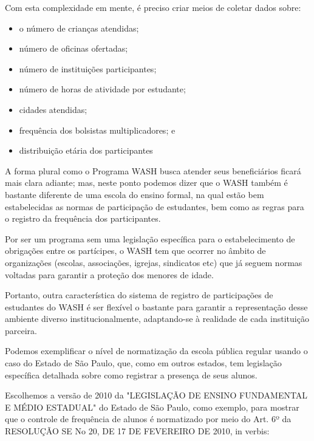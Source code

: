 Com esta complexidade em mente, é preciso criar meios de coletar dados sobre:


\begin{itemize}
\item o número de crianças atendidas;
\item número de oficinas ofertadas;
\item número de instituições participantes;
\item número de horas de atividade por estudante;
\item cidades atendidas;
\item frequência dos bolsistas multiplicadores; e
\item distribuição etária dos participantes
\end{itemize}



A forma plural como o Programa WASH busca atender seus beneficiários ficará mais clara adiante; mas, neste ponto podemos dizer que o WASH também é bastante diferente de uma escola do ensino formal, na qual estão bem estabelecidas as normas de participação de estudantes, bem como as regras para o registro da frequência dos participantes.

Por ser um programa sem uma legislação específica para o estabelecimento de obrigações entre os partícipes, o WASH tem que ocorrer no âmbito de organizações (escolas, associações, igrejas, sindicatos etc) que já seguem normas voltadas para garantir a proteção dos menores de idade.

Portanto, outra característica do sistema de registro de participações de estudantes do WASH é ser flexível o bastante para garantir a representação desse ambiente diverso institucionalmente, adaptando-se à realidade de cada instituição parceira.

Podemos exemplificar o nível de normatização da escola pública regular usando o caso do Estado de São Paulo, que, como em outros estados, tem legislação específica detalhada sobre como registrar a presença de seus alunos.

Escolhemos a versão de 2010 da "LEGISLAÇÃO DE ENSINO FUNDAMENTAL E MÉDIO ESTADUAL" do Estado de São Paulo, como exemplo, para mostrar que o controle de frequência de alunos é normatizado por meio do Art. 6º da RESOLUÇÃO SE No 20, DE 17 DE FEVEREIRO DE 2010, in verbis:


\noindent\begin{flushright}\mbox{\linespread{1}\selectfont\centering{}}\end{flushright}


